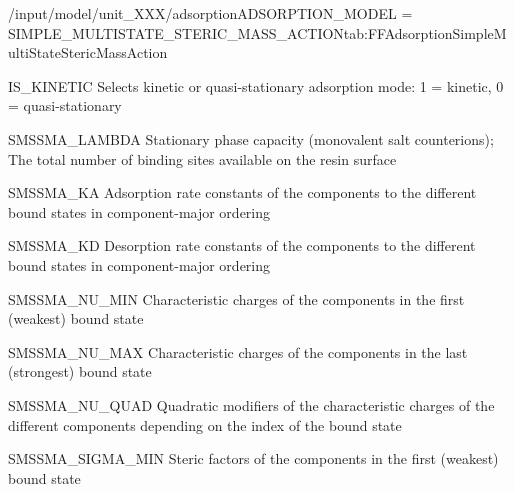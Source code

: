 \begin{condsubgroup}{/input/model/unit\_XXX/adsorption}{ADSORPTION\_MODEL = SIMPLE\_MULTISTATE\_STERIC\_MASS\_ACTION}{tab:FFAdsorptionSimpleMultiStateStericMassAction}
\begin{dataset}[type=int,range={$\{ 0,1 \}$},length=1]{IS\_KINETIC}
    Selects kinetic or quasi-stationary adsorption mode: 1 = kinetic, 0 = quasi-stationary
  \end{dataset}
  \begin{dataset}[unit=\si{\mol\per\cubic\metre\of{SP}}, type = double, range={$\geq 0$}, length={1}]{SMSSMA\_LAMBDA} 
    Stationary phase capacity (monovalent salt counterions); The total number of binding sites available on the resin surface
  \end{dataset}
  \begin{dataset}[unit=\si{\raiseto{3}\metre\of{MP}\per\raiseto{3}\metre\of{SP}\per\second} , type = double, range={$\geq 0$}, length={\texttt{NTOTALBND}}]{SMSSMA\_KA} 
    Adsorption rate constants of the components to the different bound states in component-major ordering
  \end{dataset} 
  \begin{dataset}[unit=\si{\per\second}, type = double, range={$\geq 0$}, length={\texttt{NTOTALBND}}]{SMSSMA\_KD} 
    Desorption rate constants of the components to the different bound states in component-major ordering
  \end{dataset} 
  \begin{dataset}[unit=\si{\per\second}, type = double, range={$\geq 0$}, length={\texttt{NCOMP}}]{SMSSMA\_NU\_MIN} 
    Characteristic charges of the components in the first (weakest) bound state
  \end{dataset} 
  \begin{dataset}[type = double, range={$\geq 0$}, length={\texttt{NCOMP}}]{SMSSMA\_NU\_MAX} 
    Characteristic charges of the components in the last (strongest) bound state
  \end{dataset} 
  \begin{dataset}[type = double, range={$\mathds{R}$}, length={\texttt{NCOMP}}]{SMSSMA\_NU\_QUAD} 
    Quadratic modifiers of the characteristic charges of the different components depending on the index of the bound state
  \end{dataset} 
  \begin{dataset}[type = double, range={$\geq 0$}, length={\texttt{NCOMP}}]{SMSSMA\_SIGMA\_MIN} 
    Steric factors of the components in the first (weakest) bound state
  \end{dataset} 

\end{condsubgroup}
